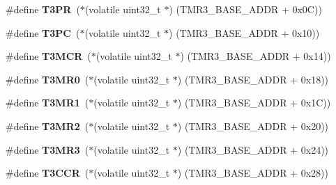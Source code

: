 \begin{DoxyCompactItemize}
\mbox{\label{group__lpc24xx__regs_ga1a5224e7e44e661c88f54c0f0748a343}} 
\#define {\bfseries T3\+PR}~($\ast$(volatile uint32\+\_\+t $\ast$) (T\+M\+R3\+\_\+\+B\+A\+S\+E\+\_\+\+A\+D\+DR + 0x0\+C))
\item 
\mbox{\label{group__lpc24xx__regs_gae8ea56af6d9b5e20d9aea98dd89b36c0}} 
\#define {\bfseries T3\+PC}~($\ast$(volatile uint32\+\_\+t $\ast$) (T\+M\+R3\+\_\+\+B\+A\+S\+E\+\_\+\+A\+D\+DR + 0x10))
\item 
\mbox{\label{group__lpc24xx__regs_ga5ec450412c081623167f56ac65b5ae22}} 
\#define {\bfseries T3\+M\+CR}~($\ast$(volatile uint32\+\_\+t $\ast$) (T\+M\+R3\+\_\+\+B\+A\+S\+E\+\_\+\+A\+D\+DR + 0x14))
\item 
\mbox{\label{group__lpc24xx__regs_ga7c97ed581cb06e06f90da62ecc31c041}} 
\#define {\bfseries T3\+M\+R0}~($\ast$(volatile uint32\+\_\+t $\ast$) (T\+M\+R3\+\_\+\+B\+A\+S\+E\+\_\+\+A\+D\+DR + 0x18))
\item 
\mbox{\label{group__lpc24xx__regs_ga183ed578c64a75184d299d65f69946d5}} 
\#define {\bfseries T3\+M\+R1}~($\ast$(volatile uint32\+\_\+t $\ast$) (T\+M\+R3\+\_\+\+B\+A\+S\+E\+\_\+\+A\+D\+DR + 0x1\+C))
\item 
\mbox{\label{group__lpc24xx__regs_ga50e861e40701e3f61246b8d153d8032e}} 
\#define {\bfseries T3\+M\+R2}~($\ast$(volatile uint32\+\_\+t $\ast$) (T\+M\+R3\+\_\+\+B\+A\+S\+E\+\_\+\+A\+D\+DR + 0x20))
\item 
\mbox{\label{group__lpc24xx__regs_gad9af1b25701a333f7be063bbaea897fe}} 
\#define {\bfseries T3\+M\+R3}~($\ast$(volatile uint32\+\_\+t $\ast$) (T\+M\+R3\+\_\+\+B\+A\+S\+E\+\_\+\+A\+D\+DR + 0x24))
\item 
\mbox{\label{group__lpc24xx__regs_gab8a63499aacfc0b50be4d44f88d14176}} 
\#define {\bfseries T3\+C\+CR}~($\ast$(volatile uint32\+\_\+t $\ast$) (T\+M\+R3\+\_\+\+B\+A\+S\+E\+\_\+\+A\+D\+DR + 0x28))
\item 
\mbox{\label{group__lpc24xx__regs_gaa4ecae7602d7383a802c419d824f1c44}} 

\end{DoxyCompactItemize}
